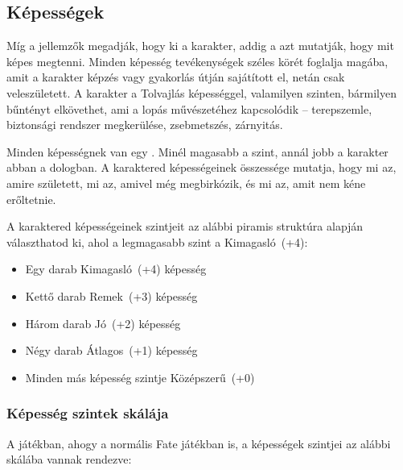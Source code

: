\subsection{Képességek}

Míg a jellemzők megadják, hogy ki a karakter, addig a  azt mutatják, hogy mit képes megtenni. Minden képesség tevékenységek széles körét foglalja magába, amit a karakter képzés vagy gyakorlás útján sajátított el, netán csak veleszületett. A karakter a Tolvajlás képességgel, valamilyen szinten, bármilyen bűntényt elkövethet, ami a lopás művészetéhez kapcsolódik – terepszemle, biztonsági rendszer megkerülése, zsebmetszés, zárnyitás.

Minden képességnek van egy . Minél magasabb a szint, annál jobb a karakter abban a dologban. A karaktered képességeinek összessége mutatja, hogy mi az, amire született, mi az, amivel még megbirkózik, és mi az, amit nem kéne erőltetnie.

A karaktered képességeinek szintjeit az alábbi piramis struktúra alapján választhatod ki, ahol a legmagasabb szint a Kimagasló~(+4):

\begin{itemize}
    \item Egy darab Kimagasló~(+4) képesség
    \item Kettő darab Remek~(+3) képesség
    \item Három darab Jó~(+2) képesség
    \item Négy darab Átlagos~(+1) képesség
    \item Minden más képesség szintje Középszerű~(+0)
\end{itemize}

\subsubsection{Képesség szintek skálája}

A  játékban, ahogy a normális Fate játékban is, a képességek szintjei az alábbi skálába vannak rendezve:

\begin{center}
\end{center}
